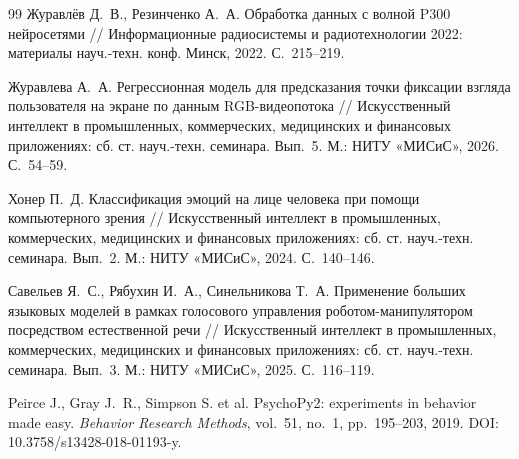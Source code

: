 \documentclass{misisarticle}
\begin{document}
\begin{thebibliography}{99}
 Журавлёв Д.~В., Резинченко А.~А. Обработка данных с волной P300 нейросетями // Информационные радиосистемы и радиотехнологии 2022: материалы науч.-техн. конф. Минск, 2022. С.~215--219.

 Журавлева А.~А. Регрессионная модель для предсказания точки фиксации взгляда пользователя на экране по данным RGB-видеопотока // Искусственный интеллект в промышленных, коммерческих, медицинских и финансовых приложениях: сб. ст. науч.-техн. семинара. Вып.~5. М.: НИТУ «МИСиС», 2026. С.~54--59.

 Хонер П.~Д. Классификация эмоций на лице человека при помощи компьютерного зрения // Искусственный интеллект в промышленных, коммерческих, медицинских и финансовых приложениях: сб. ст. науч.-техн. семинара. Вып.~2. М.: НИТУ «МИСиС», 2024. С.~140--146.

 Савельев Я.~С., Рябухин И.~А., Синельникова Т.~А. Применение больших языковых моделей в рамках голосового управления роботом-манипулятором посредством естественной речи // Искусственный интеллект в промышленных, коммерческих, медицинских и финансовых приложениях: сб. ст. науч.-техн. семинара. Вып.~3. М.: НИТУ «МИСиС», 2025. С.~116--119.

 Peirce J., Gray J.~R., Simpson S. et al. PsychoPy2: experiments in behavior made easy. \textit{Behavior Research Methods}, vol.~51, no.~1, pp.~195--203, 2019. DOI: 10.3758/s13428-018-01193-y.

\end{thebibliography}
\end{document}
